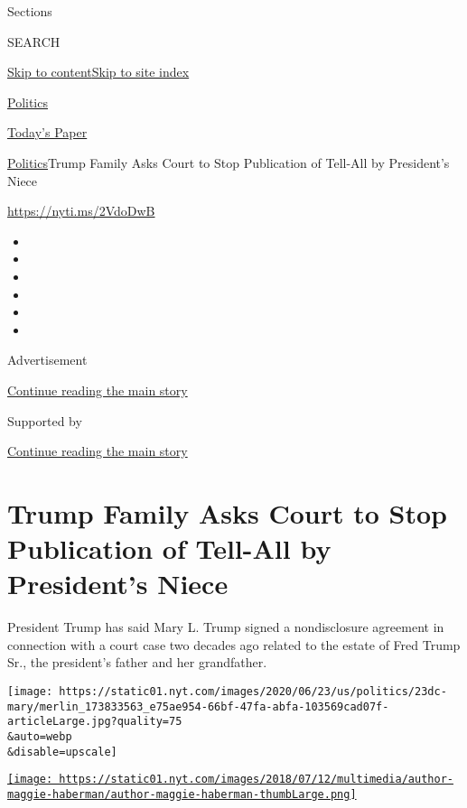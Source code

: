 Sections

SEARCH

\protect\hyperlink{site-content}{Skip to
content}\protect\hyperlink{site-index}{Skip to site index}

\href{https://www.nytimes.com/section/politics}{Politics}

\href{https://myaccount.nytimes.com/auth/login?response_type=cookie\&client_id=vi}{}

\href{https://www.nytimes.com/section/todayspaper}{Today's Paper}

\href{/section/politics}{Politics}\textbar{}Trump Family Asks Court to
Stop Publication of Tell-All by President's Niece

\url{https://nyti.ms/2VdoDwB}

\begin{itemize}
\item
\item
\item
\item
\item
\item
\end{itemize}

Advertisement

\protect\hyperlink{after-top}{Continue reading the main story}

Supported by

\protect\hyperlink{after-sponsor}{Continue reading the main story}

\hypertarget{trump-family-asks-court-to-stop-publication-of-tell-all-by-presidents-niece}{%
\section{Trump Family Asks Court to Stop Publication of Tell-All by
President's
Niece}\label{trump-family-asks-court-to-stop-publication-of-tell-all-by-presidents-niece}}

President Trump has said Mary L. Trump signed a nondisclosure agreement
in connection with a court case two decades ago related to the estate of
Fred Trump Sr., the president's father and her grandfather.

\texttt{[image: https://static01.nyt.com/images/2020/06/23/us/politics/23dc-mary/merlin\_173833563\_e75ae954-66bf-47fa-abfa-103569cad07f-articleLarge.jpg?quality=75\\\&auto=webp\\\&disable=upscale]}

\href{https://www.nytimes.com/by/maggie-haberman}{\texttt{[image: https://static01.nyt.com/images/2018/07/12/multimedia/author-maggie-haberman/author-maggie-haberman-thumbLarge.png]}}

